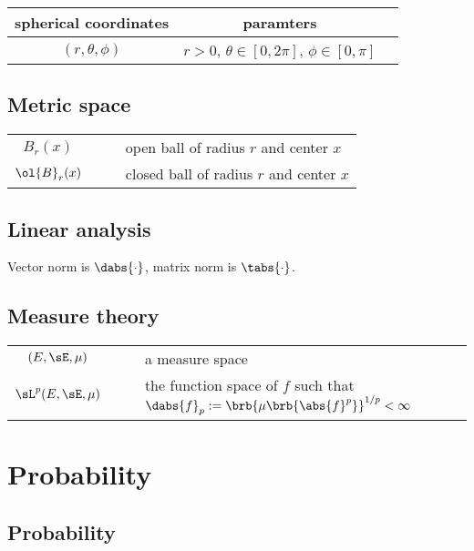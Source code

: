 \begin{center}
\begin{longtable}{ccl}
\hline
spherical coordinates & paramters \\
\hline
$(r,\theta,\phi)$ & $r>0$, $\theta\in [0,2\pi]$, $\phi\in [0,\pi]$ \\
\hline
\end{longtable}
\end{center}

\subsection{Metric space}

\begin{center}
\begin{longtable}{ccl}
\hline
$B_r(x)$ & $\quad$ & open ball of radius $r$ and center $x$ \\
$\ol{B}_r(x)$ & $\quad$ & closed ball of radius $r$ and center $x$ \\
\hline
\end{longtable}
\end{center}


\subsection{Linear analysis}

Vector norm is $\dabs{\cdot}$, matrix norm is $\tabs{\cdot}$.

\subsection{Measure theory}

\begin{center}
\begin{longtable}{ccl}
\hline
$(E,\sE,\mu)$ & $\quad$ & a measure space\\
$\sL^p(E,\sE,\mu)$ & & the function space of $f$ such that $\dabs{f}_p := \brb{\mu\brb{\abs{f}^p}}^{1/p} < \infty$\\
\hline
\end{longtable}
\end{center}

\section{Probability}

\subsection{Probability}

